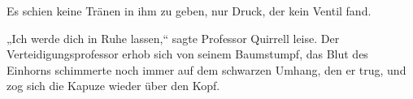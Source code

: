 Es schien keine Tränen in ihm zu geben, nur Druck, der kein Ventil fand.

„Ich werde dich in Ruhe lassen,“ sagte Professor Quirrell leise. Der Verteidigungsprofessor erhob sich von seinem Baumstumpf, das Blut des Einhorns schimmerte noch immer auf dem schwarzen Umhang, den er trug, und zog sich die Kapuze wieder über den Kopf.

